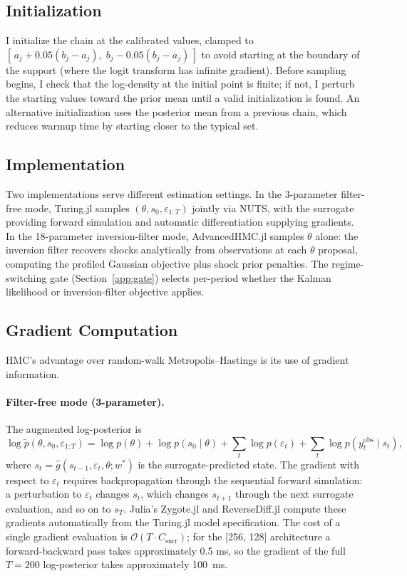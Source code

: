 \documentclass[12pt]{article}
\theoremstyle{plain}
\theoremstyle{definition}
\theoremstyle{remark}
\newcommand{\eps}{\varepsilon}
\begin{document}
\subsection{Initialization}

I initialize the chain at the \citet{smets2007shocks} calibrated values, clamped to $[\,a_j + 0.05(b_j - a_j),\; b_j - 0.05(b_j - a_j)\,]$ to avoid starting at the boundary of the support (where the logit transform has infinite gradient). Before sampling begins, I check that the log-density at the initial point is finite; if not, I perturb the starting values toward the prior mean until a valid initialization is found. An alternative initialization uses the posterior mean from a previous chain, which reduces warmup time by starting closer to the typical set.


\subsection{Implementation}

Two implementations serve different estimation settings. In the 3-parameter filter-free mode, Turing.jl samples $(\theta, s_0, \eps_{1:T})$ jointly via NUTS, with the surrogate providing forward simulation and automatic differentiation supplying gradients. In the 18-parameter inversion-filter mode, AdvancedHMC.jl samples $\theta$ alone: the inversion filter recovers shocks analytically from observations at each $\theta$ proposal, computing the profiled Gaussian objective plus shock prior penalties. The regime-switching gate (Section~\ref{app:gate}) selects per-period whether the Kalman likelihood or inversion-filter objective applies.


\subsection{Gradient Computation}

HMC's advantage over random-walk Metropolis--Hastings is its use of gradient information.

\paragraph{Filter-free mode (3-parameter).} The augmented log-posterior is
\[
\log \tilde{p}(\theta, s_0, \varepsilon_{1:T}) = \log p(\theta) + \log p(s_0 \mid \theta) + \sum_t \log p(\varepsilon_t) + \sum_t \log p(y_t^{\text{obs}} \mid s_t),
\]
where $s_t = \hat{g}(s_{t-1}, \varepsilon_t, \theta; w^*)$ is the surrogate-predicted state. The gradient with respect to $\varepsilon_t$ requires backpropagation through the sequential forward simulation: a perturbation to $\varepsilon_t$ changes $s_t$, which changes $s_{t+1}$ through the next surrogate evaluation, and so on to $s_T$. Julia's Zygote.jl and ReverseDiff.jl compute these gradients automatically from the Turing.jl model specification. The cost of a single gradient evaluation is $\mathcal{O}(T \cdot C_{\text{surr}})$; for the [256, 128] architecture a forward-backward pass takes approximately 0.5 ms, so the gradient of the full $T=200$ log-posterior takes approximately 100~ms.
\end{document}
